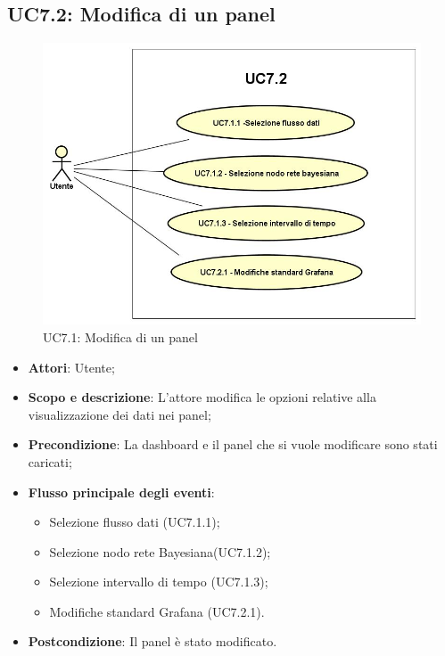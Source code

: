 \subsection{UC7.2: Modifica di un panel}
\hypertarget{UC7.2}{}
\begin{figure} [H]
	\centering
	\includegraphics[scale=0.45]{Img/UC7-2}
	\caption{UC7.1: Modifica di un panel}\label{}
\end{figure}
\begin{itemize}
	\item \textbf{Attori}: Utente;
	\item \textbf{Scopo e descrizione}: L'attore modifica le opzioni relative alla visualizzazione dei dati nei panel;
	\item \textbf{Precondizione}: La dashboard e il panel che si vuole modificare sono stati caricati;
	\item \textbf{Flusso principale degli eventi}:
	\begin{itemize}
		\item Selezione flusso dati  (UC7.1.1);
		\item Selezione nodo rete Bayesiana(UC7.1.2);
		\item Selezione intervallo di tempo (UC7.1.3);
		\item Modifiche standard Grafana  (UC7.2.1).		
	\end{itemize}
	\item \textbf{Postcondizione}: Il panel è stato modificato.
\end{itemize}
